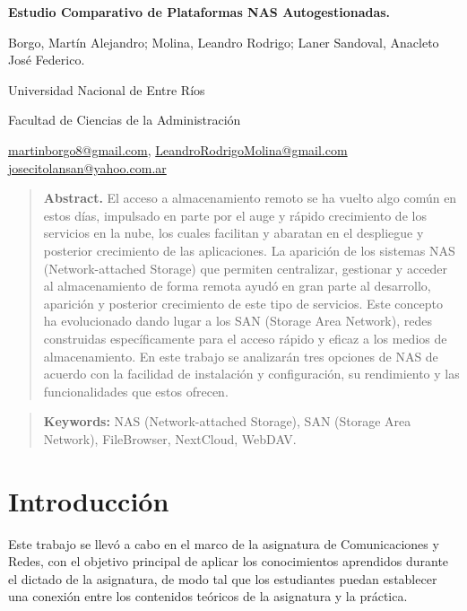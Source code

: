 \documentclass[a4paper,10pt]{article}
\begin{document}
	\centering
	{\fontsize{14}{17}\bfseries Estudio Comparativo de Plataformas NAS Autogestionadas.\par}
	{\small Borgo, Martín Alejandro; Molina, Leandro Rodrigo; Laner Sandoval, Anacleto José Federico.\par}
	{\normalsize Universidad Nacional de Entre Ríos\par}
	{\normalsize Facultad de Ciencias de la Administración\par}
	{\small
		\href{mailto:martinborgo8@gmail.com}{martinborgo8@gmail.com},
		\href{mailto:LeandroRodrigoMolina@gmail.com}{LeandroRodrigoMolina@gmail.com}
		\href{mailto:josecitolansan@yahoo.com.ar}{josecitolansan@yahoo.com.ar}
		\par}	
	{\begin{quote} \small \justify\textbf{Abstract.} El acceso a almacenamiento remoto se ha vuelto algo común en estos días, impulsado en parte por el auge y rápido crecimiento de los servicios en la nube, los cuales facilitan y abaratan en el despliegue y posterior crecimiento de las aplicaciones. La aparición de los sistemas NAS (Network-attached Storage) que permiten centralizar, gestionar y acceder al almacenamiento de forma remota ayudó en gran parte al desarrollo, aparición y posterior crecimiento de este tipo de servicios. Este concepto ha evolucionado dando lugar a los SAN (Storage Area Network), redes construidas específicamente para el acceso rápido y eficaz a los medios de almacenamiento. En este trabajo se analizarán tres opciones de NAS de acuerdo con la facilidad de instalación y configuración, su rendimiento y las funcionalidades que estos ofrecen. \end{quote} \par}
	{\begin{quote} \small \justify\textbf{Keywords:} NAS (Network-attached Storage), SAN (Storage Area Network), FileBrowser, NextCloud, WebDAV.\end{quote} \par}
	
	\justifying
	
	\section{Introducción}
	Este trabajo se llevó a cabo en el marco de la asignatura de Comunicaciones y Redes, con el objetivo principal de aplicar los conocimientos aprendidos durante el dictado de la asignatura, de modo tal que los estudiantes puedan establecer una conexión entre los contenidos teóricos de la asignatura y la práctica.
	
\end{document}
